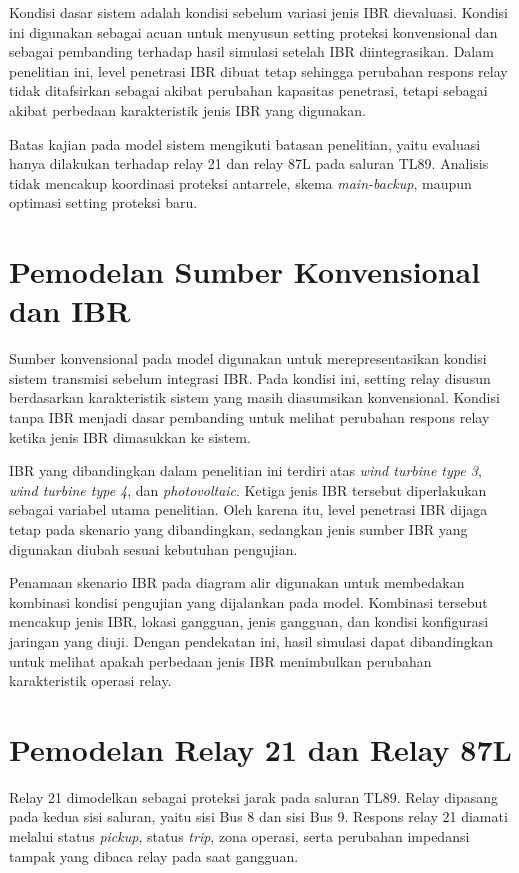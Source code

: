 Kondisi dasar sistem adalah kondisi sebelum variasi jenis IBR dievaluasi. Kondisi ini digunakan sebagai acuan untuk menyusun setting proteksi konvensional dan sebagai pembanding terhadap hasil simulasi setelah IBR diintegrasikan. Dalam penelitian ini, level penetrasi IBR dibuat tetap sehingga perubahan respons relay tidak ditafsirkan sebagai akibat perubahan kapasitas penetrasi, tetapi sebagai akibat perbedaan karakteristik jenis IBR yang digunakan.

Batas kajian pada model sistem mengikuti batasan penelitian, yaitu evaluasi hanya dilakukan terhadap relay 21 dan relay 87L pada saluran TL89. Analisis tidak mencakup koordinasi proteksi antarrele, skema \textit{main-backup}, maupun optimasi setting proteksi baru.

\section{Pemodelan Sumber Konvensional dan IBR}

Sumber konvensional pada model digunakan untuk merepresentasikan kondisi sistem transmisi sebelum integrasi IBR. Pada kondisi ini, setting relay disusun berdasarkan karakteristik sistem yang masih diasumsikan konvensional. Kondisi tanpa IBR menjadi dasar pembanding untuk melihat perubahan respons relay ketika jenis IBR dimasukkan ke sistem.

IBR yang dibandingkan dalam penelitian ini terdiri atas \textit{wind turbine type 3}, \textit{wind turbine type 4}, dan \textit{photovoltaic}. Ketiga jenis IBR tersebut diperlakukan sebagai variabel utama penelitian. Oleh karena itu, level penetrasi IBR dijaga tetap pada skenario yang dibandingkan, sedangkan jenis sumber IBR yang digunakan diubah sesuai kebutuhan pengujian.

Penamaan skenario IBR pada diagram alir digunakan untuk membedakan kombinasi kondisi pengujian yang dijalankan pada model. Kombinasi tersebut mencakup jenis IBR, lokasi gangguan, jenis gangguan, dan kondisi konfigurasi jaringan yang diuji. Dengan pendekatan ini, hasil simulasi dapat dibandingkan untuk melihat apakah perbedaan jenis IBR menimbulkan perubahan karakteristik operasi relay.

\section{Pemodelan Relay 21 dan Relay 87L}

Relay 21 dimodelkan sebagai proteksi jarak pada saluran TL89. Relay dipasang pada kedua sisi saluran, yaitu sisi Bus 8 dan sisi Bus 9. Respons relay 21 diamati melalui status \textit{pickup}, status \textit{trip}, zona operasi, serta perubahan impedansi tampak yang dibaca relay pada saat gangguan.

